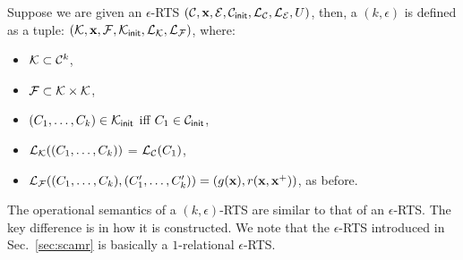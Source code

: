 Suppose we are given an $\epsilon$-RTS
$(\mathcal{C},\mathbf{x},\mathcal{E},\mathcal{C}_{\mathsf{init}},\mathcal{L}_\mathcal{C},\mathcal{L}_\mathcal{E},U)$,
then, a $(k,\epsilon)$ is defined as a tuple: $(\mathcal{K}, \mathbf{x},
\mathcal{F}, \mathcal{K}_{\mathsf{init}}, \mathcal{L}_\mathcal{K},
\mathcal{L}_\mathcal{F})$, where:

\begin{itemize}[label=--,leftmargin=1em,labelsep=*]
\item
$\mathcal{K} \subset \mathcal{C}^k$, \\
\item
$\mathcal{F} \subset \mathcal{K} \times \mathcal{K}$, \\
\item
$(C_1,\ldots,C_k) \in \mathcal{K}_{\mathsf{init}}$ iff $C_1 \in \mathcal{C}_{\mathsf{init}}$, \\
\item
$\mathcal{L}_\mathcal{K}((C_1,\ldots,C_k))$ =
$\mathcal{L}_\mathcal{C}(C_1)$, \\
\item
$\mathcal{L}_\mathcal{F}((C_1,\ldots,C_k),(C'_1,\ldots,C'_k)) =
(g(\mathbf{x}),r(\mathbf{x},\mathbf{x}^{+}))$, as before.
\end{itemize}

The operational semantics of a $(k,\epsilon)$-RTS are similar to that
of an $\epsilon$-RTS. The key difference is in how it is constructed.
We note that the $\epsilon$-RTS introduced in Sec.~\ref{sec:scamr} is
basically a $1$-relational $\epsilon$-RTS.


% 

